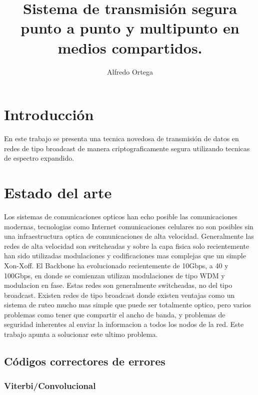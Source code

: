 \documentclass[a4paper,10pt]{report}
\title{Sistema de transmisión segura punto a punto y multipunto en medios compartidos.}
\author{Alfredo Ortega}
\begin{document}
\maketitle
\newpage
\tableofcontents
\newpage

\section{Introducción}
En este trabajo se presenta una tecnica novedosa de transmisión de datos en redes de tipo broadcast de manera criptograficamente segura utilizando tecnicas de espectro expandido.



\section{Estado del arte}
Los sistemas de comunicaciones opticos han echo posible las comunicaciones modernas, tecnologias como Internet comunicaciones celulares no son posibles sin una infraestructura optica de comunicaciones de alta velocidad.
Generalmente las redes de alta velocidad son switcheadas y sobre la capa fisica solo recientemente han sido utilizadas modulaciones y codificaciones mas complejas que un simple Xon-Xoff.
El Backbone ha evolucionado recientemente de 10Gbps, a 40 y 100Gbps, en donde se comienzan utilizan modulaciones de tipo WDM y modulacion en fase. Estas redes son generalmente switcheadas, no del tipo broadcast.
Existen redes de tipo broadcast donde existen ventajas como un sistema de ruteo mucho mas simple que puede ser totalmente optico, pero varios problemas como tener que compartir el ancho de banda, y problemas de seguridad inherentes al enviar la informacion a todos los nodos de la red. Este trabajo apunta a solucionar este ultimo problema.

\subsection{Códigos correctores de errores}
\subsubsection{Viterbi/Convolucional}
\end{document}
